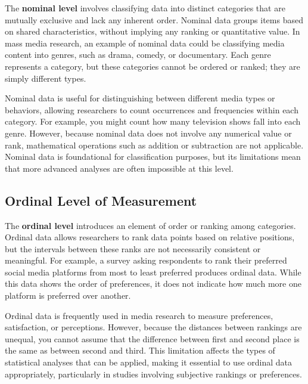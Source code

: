 \documentclass[
]{book}
\begin{document}
The \textbf{nominal level} involves classifying data into distinct categories that are mutually exclusive and lack any inherent order. Nominal data groups items based on shared characteristics, without implying any ranking or quantitative value. In mass media research, an example of nominal data could be classifying media content into genres, such as drama, comedy, or documentary. Each genre represents a category, but these categories cannot be ordered or ranked; they are simply different types.

Nominal data is useful for distinguishing between different media types or behaviors, allowing researchers to count occurrences and frequencies within each category. For example, you might count how many television shows fall into each genre. However, because nominal data does not involve any numerical value or rank, mathematical operations such as addition or subtraction are not applicable. Nominal data is foundational for classification purposes, but its limitations mean that more advanced analyses are often impossible at this level.

\subsection*{Ordinal Level of Measurement}\label{ordinal-level-of-measurement}

The \textbf{ordinal level} introduces an element of order or ranking among categories. Ordinal data allows researchers to rank data points based on relative positions, but the intervals between these ranks are not necessarily consistent or meaningful. For example, a survey asking respondents to rank their preferred social media platforms from most to least preferred produces ordinal data. While this data shows the order of preferences, it does not indicate how much more one platform is preferred over another.

Ordinal data is frequently used in media research to measure preferences, satisfaction, or perceptions. However, because the distances between rankings are unequal, you cannot assume that the difference between first and second place is the same as between second and third. This limitation affects the types of statistical analyses that can be applied, making it essential to use ordinal data appropriately, particularly in studies involving subjective rankings or preferences.
\end{document}
